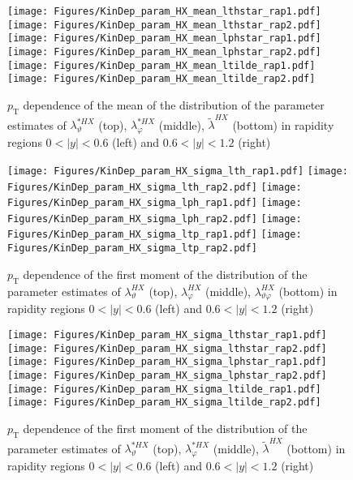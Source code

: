 \documentclass[12pt]{article}
\newcommand{\pT}{p_\mathrm{T}}
\newcommand{\absy}{\left |  y \right |}
\newcommand{\lamthHX}{\lambda^{\scriptscriptstyle HX}_\vartheta}
\newcommand{\lamphHX}{\lambda^{\scriptscriptstyle HX}_\varphi}
\newcommand{\lamthphHX}{\lambda^{\scriptscriptstyle HX}_{\vartheta \varphi}}
\newcommand{\lamtildeHX}{\tilde{\lambda}^{\scriptscriptstyle HX}}
\newcommand{\lamthstarHX}{\lambda^{* \scriptscriptstyle HX}_\vartheta}
\newcommand{\lamphstarHX}{\lambda^{* \scriptscriptstyle HX}_\varphi}
\begin{document}
\begin{figure}[htbp]
\centering
\texttt{[image: Figures/KinDep\_param\_HX\_mean\_lthstar\_rap1.pdf]}
\texttt{[image: Figures/KinDep\_param\_HX\_mean\_lthstar\_rap2.pdf]}
\texttt{[image: Figures/KinDep\_param\_HX\_mean\_lphstar\_rap1.pdf]}
\texttt{[image: Figures/KinDep\_param\_HX\_mean\_lphstar\_rap2.pdf]}
\texttt{[image: Figures/KinDep\_param\_HX\_mean\_ltilde\_rap1.pdf]}
\texttt{[image: Figures/KinDep\_param\_HX\_mean\_ltilde\_rap2.pdf]}
\caption{$\pT$ dependence of the mean of the distribution of the parameter estimates of $\lamthstarHX$ (top), $\lamphstarHX$ (middle), $\lamtildeHX$ (bottom) in rapidity regions $0<\absy<0.6$ (left) and $0.6<\absy<1.2$ (right)}
\end{figure}
\clearpage


\begin{figure}[htbp]
\centering
\texttt{[image: Figures/KinDep\_param\_HX\_sigma\_lth\_rap1.pdf]}
\texttt{[image: Figures/KinDep\_param\_HX\_sigma\_lth\_rap2.pdf]}
\texttt{[image: Figures/KinDep\_param\_HX\_sigma\_lph\_rap1.pdf]}
\texttt{[image: Figures/KinDep\_param\_HX\_sigma\_lph\_rap2.pdf]}
\texttt{[image: Figures/KinDep\_param\_HX\_sigma\_ltp\_rap1.pdf]}
\texttt{[image: Figures/KinDep\_param\_HX\_sigma\_ltp\_rap2.pdf]}
\caption{$\pT$ dependence of the first moment of the distribution of the parameter estimates of $\lamthHX$ (top), $\lamphHX$ (middle), $\lamthphHX$ (bottom) in rapidity regions $0<\absy<0.6$ (left) and $0.6<\absy<1.2$ (right)}
\end{figure}
\clearpage

\begin{figure}[htbp]
\centering
\texttt{[image: Figures/KinDep\_param\_HX\_sigma\_lthstar\_rap1.pdf]}
\texttt{[image: Figures/KinDep\_param\_HX\_sigma\_lthstar\_rap2.pdf]}
\texttt{[image: Figures/KinDep\_param\_HX\_sigma\_lphstar\_rap1.pdf]}
\texttt{[image: Figures/KinDep\_param\_HX\_sigma\_lphstar\_rap2.pdf]}
\texttt{[image: Figures/KinDep\_param\_HX\_sigma\_ltilde\_rap1.pdf]}
\texttt{[image: Figures/KinDep\_param\_HX\_sigma\_ltilde\_rap2.pdf]}
\caption{$\pT$ dependence of the first moment of the distribution of the parameter estimates of $\lamthstarHX$ (top), $\lamphstarHX$ (middle), $\lamtildeHX$ (bottom) in rapidity regions $0<\absy<0.6$ (left) and $0.6<\absy<1.2$ (right)}
\end{figure}
\clearpage
\end{document}
